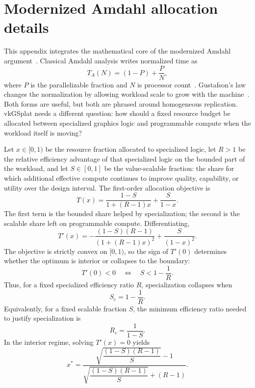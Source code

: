 \documentclass[10pt,journal]{IEEEtran}
\begin{document}
\appendices
\section{Modernized Amdahl allocation details}
\label{app:amdahl}

This appendix integrates the mathematical core of the modernized Amdahl
argument~\cite{lu2026amdahl}.  Classical Amdahl analysis writes
normalized time as
\begin{equation}
  T_A(N) = (1-P) + \frac{P}{N},
  \label{eq:appendix-amdahl}
\end{equation}
where $P$ is the parallelizable fraction and $N$ is processor
count~\cite{amdahl1967}.  Gustafson's law changes the normalization by
allowing workload scale to grow with the machine~\cite{gustafson1988}.
Both forms are useful, but both are phrased around homogeneous
replication.  vkGSplat needs a different question: how should a fixed
resource budget be allocated between specialized graphics logic and
programmable compute when the workload itself is moving?

Let $x \in [0,1)$ be the resource fraction allocated to specialized
logic, let $R>1$ be the relative efficiency advantage of that specialized
logic on the bounded part of the workload, and let $S \in [0,1]$ be the
value-scalable fraction: the share for which additional effective
compute continues to improve quality, capability, or utility over the
design interval.  The first-order allocation objective is
\begin{equation}
  T(x) =
  \frac{1-S}{1+(R-1)x} + \frac{S}{1-x}.
  \label{eq:appendix-allocation}
\end{equation}
The first term is the bounded share helped by specialization; the second
is the scalable share left on programmable compute.  Differentiating,
\begin{equation}
  T'(x)
  =
  -\frac{(1-S)(R-1)}{\left(1+(R-1)x\right)^2}
  + \frac{S}{(1-x)^2}.
  \label{eq:appendix-derivative}
\end{equation}
The objective is strictly convex on $[0,1)$, so the sign of $T'(0)$
determines whether the optimum is interior or collapses to the boundary:
\begin{equation}
  T'(0) < 0
  \quad\Longleftrightarrow\quad
  S < 1 - \frac{1}{R}.
  \label{eq:appendix-threshold}
\end{equation}
Thus, for a fixed specialized efficiency ratio $R$, specialization
collapses when
\begin{equation}
  S_c = 1 - \frac{1}{R}.
  \label{eq:appendix-sc}
\end{equation}
Equivalently, for a fixed scalable fraction $S$, the minimum efficiency
ratio needed to justify specialization is
\begin{equation}
  R_c = \frac{1}{1-S}.
  \label{eq:appendix-rc}
\end{equation}
In the interior regime, solving $T'(x)=0$ yields
\begin{equation}
  x^*
  =
  \frac{\sqrt{\dfrac{(1-S)(R-1)}{S}} - 1}
       {\sqrt{\dfrac{(1-S)(R-1)}{S}} + (R-1)}.
  \label{eq:appendix-optimum}
\end{equation}
\end{document}
